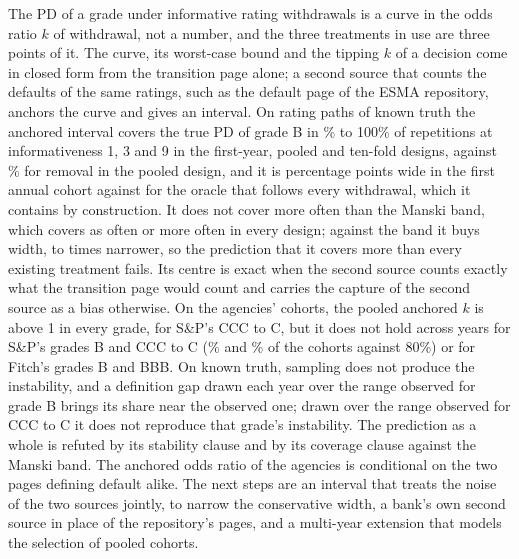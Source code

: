 The PD of a grade under informative rating withdrawals is a curve in the odds ratio $k$ of withdrawal, not a number, and the three treatments in use are three points of it. The curve, its worst-case bound and the tipping $k$ of a decision come in closed form from the transition page alone; a second source that counts the defaults of the same ratings, such as the default page of the ESMA repository, anchors the curve and gives an interval. On rating paths of known truth the anchored interval covers the true PD of grade B in \% to 100\% of  repetitions at informativeness 1, 3 and 9 in the first-year, pooled and ten-fold designs, against \% for removal in the pooled design, and it is  percentage points wide in the first annual cohort against  for the oracle that follows every withdrawal, which it contains by construction. It does not cover more often than the Manski band, which covers as often or more often in every design; against the band it buys width,  to  times narrower, so the prediction that it covers more than every existing treatment fails. Its centre is exact when the second source counts exactly what the transition page would count and carries the capture of the second source as a bias otherwise. On the agencies' cohorts, the pooled anchored $k$ is above 1 in every grade,  for S\&P's CCC to C, but it does not hold across years for S\&P's grades B and CCC to C (\% and \% of the cohorts against 80\%) or for Fitch's grades B and BBB. On known truth, sampling does not produce the instability, and a definition gap drawn each year over the range observed for grade B brings its share near the observed one; drawn over the range observed for CCC to C it does not reproduce that grade's instability. The prediction as a whole is refuted by its stability clause and by its coverage clause against the Manski band. The anchored odds ratio of the agencies is conditional on the two pages defining default alike. The next steps are an interval that treats the noise of the two sources jointly, to narrow the conservative width, a bank's own second source in place of the repository's pages, and a multi-year extension that models the selection of pooled cohorts.
